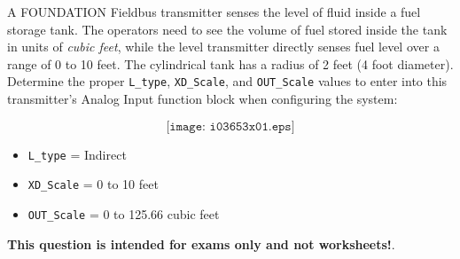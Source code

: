 

A FOUNDATION Fieldbus transmitter senses the level of fluid inside a fuel storage tank.  The operators need to see the volume of fuel stored inside the tank in units of {\it cubic feet}, while the level transmitter directly senses fuel level over a range of 0 to 10 feet.  The cylindrical tank has a radius of 2 feet (4 foot diameter).  Determine the proper {\tt L\_type}, {\tt XD\_Scale}, and {\tt OUT\_Scale} values to enter into this transmitter's Analog Input function block when configuring the system:

$$\texttt{[image: i03653x01.eps]}$$







\begin{itemize}
\item{} {\tt L\_type} = Indirect
\item{} {\tt XD\_Scale} = 0 to 10 feet
\item{} {\tt OUT\_Scale} = 0 to 125.66 cubic feet
\end{itemize}







{\bf This question is intended for exams only and not worksheets!}.



